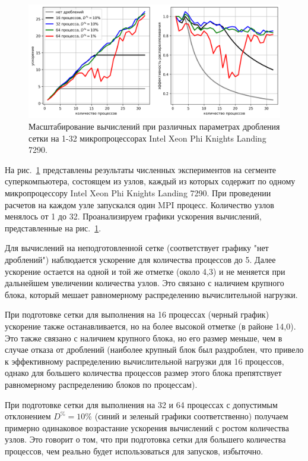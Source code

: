 \begin{figure}[ht]
\centering
\includegraphics[width=1.0\textwidth]{./pics/text_2_withcut/scaling3.png}
\singlespacing
{}\caption{Масштабирование вычислений при различных параметрах дробления сетки на 1-32 микропроцессорах Intel Xeon Phi Knights Landing 7290.}
\label{fig:text_2_withcut_scaling3}
\end{figure}

На рис.~\ref{fig:text_2_withcut_scaling3} представлены результаты численных экспериментов на сегменте суперкомпьютера, состоящем из узлов, каждый из которых содержит по одному микропроцессору Intel Xeon Phi Knights Landing 7290.
При проведении расчетов на каждом узле запускался один MPI процесс.
Количество узлов менялось от 1 до 32.
Проанализируем графики ускорения вычислений, представленные на рис.~\ref{fig:text_2_withcut_scaling3}.

Для вычислений на неподготовленной сетке (соответствует графику "нет дроблений") наблюдается ускорение для количества процессов до 5.
Далее ускорение остается на одной и той же отметке (около 4,3) и не меняется при дальнейшем увеличении количества узлов.
Это связано с наличием крупного блока, который мешает равномерному распределению вычислительной нагрузки.

При подготовке сетки для выполнения на 16 процессах (черный график) ускорение также останавливается, но на более высокой отметке (в районе 14,0).
Это также связано с наличием крупного блока, но его размер меньше, чем в случае отказа от дроблений (наиболее крупный блок был раздроблен, что привело к эффективному распределению вычислительной нагрузки для 16 процессов, однако для большего количества процессов размер этого блока препятствует равномерному распределению блоков по процессам).

При подготовке сетки для выполнения на 32 и 64 процессах с допустимым отклонением $D^{\%} = 10\%$ (синий и зеленый графики соответственно) получаем примерно одинаковое возрастание ускорения вычислений с ростом количества узлов.
Это говорит о том, что при подготовка сетки для большего количества процессов, чем реально будет использоваться для запусков, избыточно.

